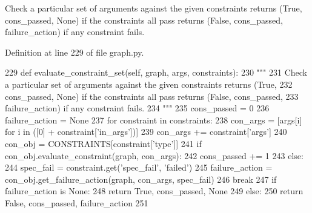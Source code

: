\begin{DoxyVerb}Check a particular set of arguments against the given constraints returns (True,
cons_passed, None) if the constraints all pass returns (False, cons_passed,
failure_action) if any constraint fails.
\end{DoxyVerb}
 

Definition at line 229 of file graph.\+py.


\begin{DoxyCode}
229     \textcolor{keyword}{def }evaluate\_constraint\_set(self, graph, args, constraints):
230         \textcolor{stringliteral}{"""}
231 \textcolor{stringliteral}{        Check a particular set of arguments against the given constraints returns (True,}
232 \textcolor{stringliteral}{        cons\_passed, None) if the constraints all pass returns (False, cons\_passed,}
233 \textcolor{stringliteral}{        failure\_action) if any constraint fails.}
234 \textcolor{stringliteral}{        """}
235         cons\_passed = 0
236         failure\_action = \textcolor{keywordtype}{None}
237         \textcolor{keywordflow}{for} constraint \textcolor{keywordflow}{in} constraints:
238             con\_args = [args[i] \textcolor{keywordflow}{for} i \textcolor{keywordflow}{in} ([0] + constraint[\textcolor{stringliteral}{'in\_args'}])]
239             con\_args += constraint[\textcolor{stringliteral}{'args'}]
240             con\_obj = CONSTRAINTS[constraint[\textcolor{stringliteral}{'type'}]]
241             \textcolor{keywordflow}{if} con\_obj.evaluate\_constraint(graph, con\_args):
242                 cons\_passed += 1
243             \textcolor{keywordflow}{else}:
244                 spec\_fail = constraint.get(\textcolor{stringliteral}{'spec\_fail'}, \textcolor{stringliteral}{'failed'})
245                 failure\_action = con\_obj.get\_failure\_action(graph, con\_args, spec\_fail)
246                 \textcolor{keywordflow}{break}
247         \textcolor{keywordflow}{if} failure\_action \textcolor{keywordflow}{is} \textcolor{keywordtype}{None}:
248             \textcolor{keywordflow}{return} \textcolor{keyword}{True}, cons\_passed, \textcolor{keywordtype}{None}
249         \textcolor{keywordflow}{else}:
250             \textcolor{keywordflow}{return} \textcolor{keyword}{False}, cons\_passed, failure\_action
251 
\end{DoxyCode}
\mbox{\label{classlight__chats_1_1graph_1_1GraphFunction_a9fd67b8cadf1f9be60d4885d21287518}} 
